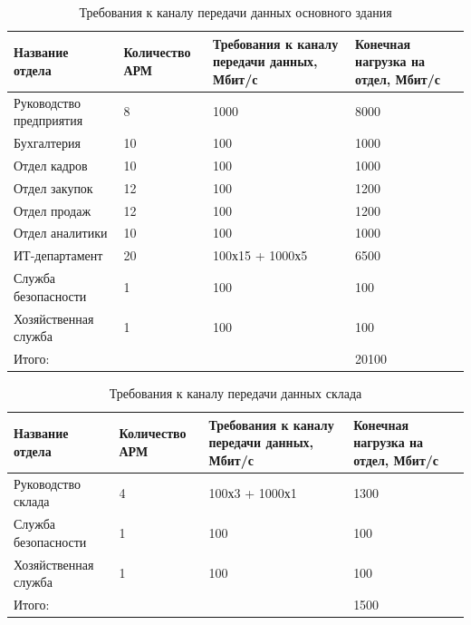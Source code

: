 \begin{table}[H]
    \centering
    \caption{Требования к каналу передачи данных основного здания\label{table:ARM_chanal_oz}}
    \small
	\begin{tabularx}{\textwidth}{|X|p{2cm}|X|X|}
        \hline
		Название отдела&Количество АРМ&Требования к каналу передачи данных, Мбит/с&Конечная нагрузка на отдел, Мбит/с \\
        \hline
		Руководство предприятия         & 8       		&  	1000				&	8000  \\
		\hline
		Бухгалтерия						& 10         	&  	100					&	1000  \\
        \hline
		Отдел кадров					& 10         	&  	100					&	1000  \\
        \hline
		Отдел закупок					& 12         	&  	100					&	1200  \\
        \hline
		Отдел продаж					& 12         	&  	100					&	1200  \\
        \hline
		Отдел аналитики					& 10         	&  	100					&	1000  \\
        \hline
		ИТ-департамент					& 20         	&  	100х15 + 1000х5		&	6500  \\
        \hline
		Служба безопасности				& 1				& 	100					&	100	  \\
		\hline
		Хозяйственная служба			& 1         	&  	100					&	100  \\
        \hline
		\multicolumn{3}{|X|}{Итого:}											& 20100 \\
		\hline
    \end{tabularx}
\end{table}

\begin{table}[H]
    \centering
    \caption{Требования к каналу передачи данных склада\label{table:ARM_chanal_sk}}
    \small
	\begin{tabularx}{\textwidth}{|X|p{2cm}|X|X|}
        \hline
		Название отдела&Количество АРМ&Требования к каналу передачи данных, Мбит/с&Конечная нагрузка на отдел, Мбит/с \\
        \hline
		Руководство склада         		& 4       		&  	100х3 + 1000х1		&	1300  \\
		\hline
		Служба безопасности				& 1				& 	100					&	100	  \\
		\hline
		Хозяйственная служба			& 1         	&  	100					&	100  \\
        \hline
		\multicolumn{3}{|X|}{Итого:}											& 1500 \\
		\hline
    \end{tabularx}
\end{table}

